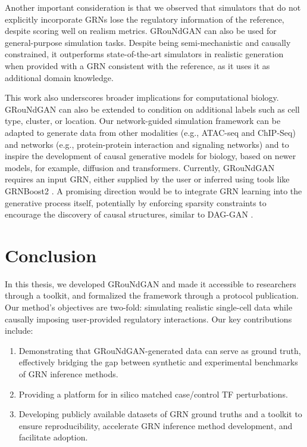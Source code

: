 Another important consideration is that we observed that simulators that do not explicitly incorporate GRNs lose the regulatory information of the reference, despite scoring well on realism metrics. GRouNdGAN can also be used for general-purpose simulation tasks. Despite being semi-mechanistic and causally constrained, it outperforms state-of-the-art simulators in realistic generation when provided with a GRN consistent with the reference, as it uses it as additional domain knowledge.

This work also underscores broader implications for computational biology. GRouNdGAN can also be extended to condition on additional labels such as cell type, cluster, or location. Our network-guided simulation framework can be adapted to generate data from other modalities (e.g., ATAC-seq and ChIP-Seq) and networks (e.g., protein-protein interaction and signaling networks) and to inspire the development of causal generative models for biology, based on newer models, for example, diffusion and transformers. Currently, GRouNdGAN requires an input GRN, either supplied by the user or inferred using tools like GRNBoost2 \cite{moerman2019grnboost2}. A promising direction would be to integrate GRN learning into the generative process itself, potentially by enforcing sparsity constraints to encourage the discovery of causal structures, similar to DAG-GAN \cite{gao2021dag}. 

\section*{Conclusion}
In this thesis, we developed GRouNdGAN and made it accessible to researchers through a toolkit, and formalized the framework through a protocol publication. Our method's objectives are two-fold: simulating realistic single-cell data while causally imposing user-provided regulatory interactions. Our key contributions include: 

\begin{enumerate}
\item Demonstrating that GRouNdGAN-generated data can serve as ground truth, effectively bridging the gap between synthetic and experimental benchmarks of GRN inference methods.
\item Providing a platform for in silico matched case/control TF perturbations.
\item Developing publicly available datasets of GRN ground truths and a toolkit to ensure reproducibility, accelerate GRN inference method development, and facilitate adoption.
\end{enumerate}



